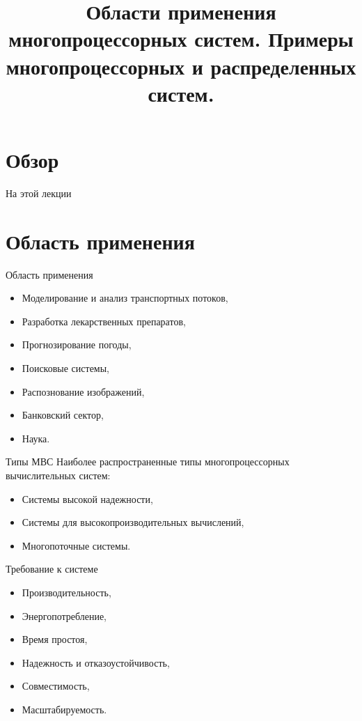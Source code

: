 

\title{Области применения многопроцессорных систем. Примеры многопроцессорных и распределенных систем.}



\begin{frame}
\titlepage
\end{frame}

\section*{Обзор}

\begin{frame}{На этой лекции}
\tableofcontents
\end{frame}

\section{Область применения}

\begin{frame}{Область применения}
\begin{itemize}
    \item Моделирование и анализ транспортных потоков,
    \item Разработка лекарственных препаратов,
    \item Прогнозирование погоды,
    \item Поисковые системы,
    \item Распознование изображений,
    \item Банковский сектор,
    \item Наука.
\end{itemize}
\end{frame}

\begin{frame}{Типы МВС}
Наиболее распространенные типы многопроцессорных вычислительных систем:
\begin{itemize}
    \item Системы высокой надежности,
    \item Системы для высокопроизводительных вычислений,
    \item Многопоточные системы.
\end{itemize}
\end{frame}

\begin{frame}{Требование к системе}
\begin{itemize}
    \item Производительность,
    \item Энергопотребление,
    \item Время простоя,
    \item Надежность и отказоустойчивость,
    \item Совместимость,
    \item Масштабируемость.
\end{itemize}
\end{frame}

